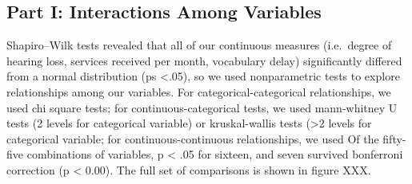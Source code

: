 \documentclass[english,man]{apa6}
\begin{document}
\hypertarget{part-i-interactions-among-variables}{%
\subsection{Part I: Interactions Among Variables}\label{part-i-interactions-among-variables}}

Shapiro--Wilk tests revealed that all of our continuous measures (i.e.~degree of hearing loss, services received per month, vocabulary delay) significantly differed from a normal distribution (ps \textless{}.05), so we used nonparametric tests to explore relationships among our variables. For categorical-categorical relationships, we used chi square tests; for continuous-categorical tests, we used mann-whitney U tests (2 levels for categorical variable) or kruskal-wallis tests (\textgreater{}2 levels for categorical variable; for continuous-continuous relationships, we used Of the fifty-five combinations of variables, p \textless{} .05 for sixteen, and seven survived bonferroni correction (p \textless{} 0.00). The full set of comparisons is shown in figure XXX.
\end{document}
